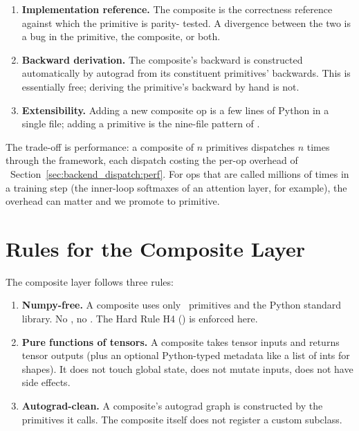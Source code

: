 \begin{enumerate}
  \item \textbf{Implementation reference.} The composite is the
    correctness reference against which the primitive is parity-
    tested. A divergence between the two is a bug in the
    primitive, the composite, or both.
  \item \textbf{Backward derivation.} The composite's backward is
    constructed automatically by autograd from its constituent
    primitives' backwards. This is essentially free; deriving the
    primitive's backward by hand is not.
  \item \textbf{Extensibility.} Adding a new composite op is a few
    lines of Python in a single file; adding a primitive is the
    nine-file pattern of .
\end{enumerate}

The trade-off is performance: a composite of \(n\) primitives
dispatches \(n\) times through the framework, each dispatch
costing the per-op overhead of
~Section~\ref{sec:backend_dispatch:perf}.
For ops that are called millions of times in a training step (the
inner-loop softmaxes of an attention layer, for example), the
overhead can matter and we promote to primitive.

\section{Rules for the Composite Layer}
\label{sec:composite_ops:rules}

The composite layer follows three rules:

\begin{enumerate}
  \item \textbf{Numpy-free.} A composite uses only \Lucid\
    primitives and the Python standard library. No
    , no . The Hard Rule H4
    (\chref{ch:bridge_boundaries}) is enforced here.
  \item \textbf{Pure functions of tensors.} A composite takes
    tensor inputs and returns tensor outputs (plus an optional
    Python-typed metadata like a list of ints for shapes). It does
    not touch global state, does not mutate inputs, does not have
    side effects.
  \item \textbf{Autograd-clean.} A composite's autograd graph is
    constructed by the primitives it calls. The composite itself
    does not register a custom \code{Function} subclass.
\end{enumerate}

